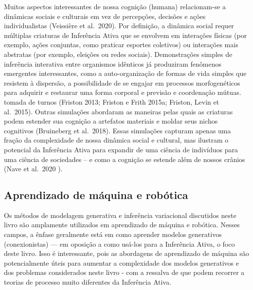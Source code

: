 \documentclass[
  12pt,
]{book}
\begin{document}
Muitos aspectos interessantes de nossa cognição (humana) relacionam-se a dinâmicas sociais e culturais em vez de percepções, decisões e ações individualistas (Veissière et al.~2020). Por definição, a dinâmica social requer múltiplas criaturas de Inferência Ativa que se envolvem em interações físicas (por exemplo, ações conjuntas, como praticar esportes coletivos) ou interações mais abstratas (por exemplo, eleições ou redes sociais). Demonstrações simples de inferência interativa entre organismos idênticos já produziram fenômenos emergentes interessantes, como a auto-organização de formas de vida simples que resistem à dispersão, a possibilidade de se engajar em processos morfogenéticos para adquirir e restaurar uma forma corporal e previsão e coordenação mútuas. tomada de turnos (Friston 2013; Friston e Frith 2015a; Friston, Levin et al.~2015). Outras simulações abordaram as maneiras pelas quais as criaturas podem estender sua cognição a artefatos materiais e moldar seus nichos cognitivos (Bruineberg et al.~2018). Essas simulações capturam apenas uma fração da complexidade de nossa dinâmica social e cultural, mas ilustram o potencial da Inferência Ativa para expandir de uma ciência de indivíduos para uma ciência de sociedades -- e como a cognição se estende além de nossos crânios (Nave et al.~2020 ).

\hypertarget{aprendizado-de-muxe1quina-e-robuxf3tica}{%
\subsection{Aprendizado de máquina e robótica}\label{aprendizado-de-muxe1quina-e-robuxf3tica}}

Os métodos de modelagem generativa e inferência variacional discutidos neste livro são amplamente utilizados em aprendizado de máquina e robótica. Nesses campos, a ênfase geralmente está em como aprender modelos generativos (conexionistas) --- em oposição a como usá-los para a Inferência Ativa, o foco deste livro. Isso é interessante, pois as abordagens de aprendizado de máquina são potencialmente úteis para aumentar a complexidade dos modelos generativos e dos problemas considerados neste livro - com a ressalva de que podem recorrer a teorias de processo muito diferentes da Inferência Ativa.
\end{document}
